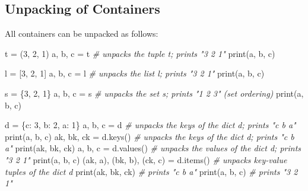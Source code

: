 \documentclass[
]{article}
\newenvironment{Shaded}{}{}
\newcommand{\BuiltInTok}[1]{#1}
\newcommand{\CommentTok}[1]{\textcolor[rgb]{0.38,0.63,0.69}{\textit{#1}}}
\newcommand{\DecValTok}[1]{\textcolor[rgb]{0.25,0.63,0.44}{#1}}
\newcommand{\NormalTok}[1]{#1}
\newcommand{\OperatorTok}[1]{\textcolor[rgb]{0.40,0.40,0.40}{#1}}
\newcommand{\StringTok}[1]{\textcolor[rgb]{0.25,0.44,0.63}{#1}}
\begin{document}
\hypertarget{unpacking-of-containers}{%
\subsection{Unpacking of Containers}\label{unpacking-of-containers}}

All containers can be unpacked as follows:

\begin{Shaded}
\begin{Highlighting}[]
\NormalTok{t }\OperatorTok{=}\NormalTok{ (}\DecValTok{3}\NormalTok{, }\DecValTok{2}\NormalTok{, }\DecValTok{1}\NormalTok{)}
\NormalTok{a, b, c }\OperatorTok{=}\NormalTok{ t  }\CommentTok{\# unpacks the tuple t; prints "3 2 1"}
\BuiltInTok{print}\NormalTok{(a, b, c)}

\NormalTok{l }\OperatorTok{=}\NormalTok{ [}\DecValTok{3}\NormalTok{, }\DecValTok{2}\NormalTok{, }\DecValTok{1}\NormalTok{]}
\NormalTok{a, b, c }\OperatorTok{=}\NormalTok{ l  }\CommentTok{\# unpacks the list l; prints "3 2 1"}
\BuiltInTok{print}\NormalTok{(a, b, c)}

\NormalTok{s }\OperatorTok{=}\NormalTok{ \{}\DecValTok{3}\NormalTok{, }\DecValTok{2}\NormalTok{, }\DecValTok{1}\NormalTok{\}}
\NormalTok{a, b, c }\OperatorTok{=}\NormalTok{ s  }\CommentTok{\# unpacks the set s; prints "1 2 3" (set ordering)}
\BuiltInTok{print}\NormalTok{(a, b, c)}

\NormalTok{d }\OperatorTok{=}\NormalTok{ \{}\StringTok{\textquotesingle{}c\textquotesingle{}}\NormalTok{: }\DecValTok{3}\NormalTok{, }\StringTok{\textquotesingle{}b\textquotesingle{}}\NormalTok{: }\DecValTok{2}\NormalTok{, }\StringTok{\textquotesingle{}a\textquotesingle{}}\NormalTok{: }\DecValTok{1}\NormalTok{\}}
\NormalTok{a, b, c }\OperatorTok{=}\NormalTok{ d            }\CommentTok{\# unpacks the keys of the dict d; prints "c b a"}
\BuiltInTok{print}\NormalTok{(a, b, c)}
\NormalTok{ak, bk, ck }\OperatorTok{=}\NormalTok{ d.keys()  }\CommentTok{\# unpacks the keys of the dict d; prints "c b a"}
\BuiltInTok{print}\NormalTok{(ak, bk, ck)}
\NormalTok{a, b, c }\OperatorTok{=}\NormalTok{ d.values()   }\CommentTok{\# unpacks the values of the dict d; prints "3 2 1"}
\BuiltInTok{print}\NormalTok{(a, b, c)}
\NormalTok{(ak, a), (bk, b), (ck, c) }\OperatorTok{=}\NormalTok{ d.items()  }\CommentTok{\# unpacks key{-}value tuples of the dict d}
\BuiltInTok{print}\NormalTok{(ak, bk, ck)      }\CommentTok{\# prints "c b a"}
\BuiltInTok{print}\NormalTok{(a, b, c)         }\CommentTok{\# prints "3 2 1"}
\end{Highlighting}
\end{Shaded}
\end{document}
